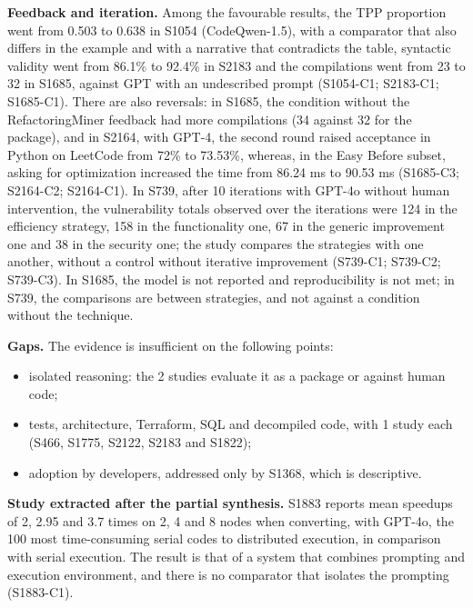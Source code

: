 \textbf{Feedback and iteration.}
Among the favourable results, the TPP proportion went from 0.503 to 0.638 in S1054 (CodeQwen-1.5), with a comparator that also differs in the example and with a narrative that contradicts the table, syntactic validity went from 86.1\% to 92.4\% in S2183 and the compilations went from 23 to 32 in S1685, against GPT with an undescribed prompt (S1054-C1; S2183-C1; S1685-C1).
There are also reversals: in S1685, the condition without the RefactoringMiner feedback had more compilations (34 against 32 for the package), and in S2164, with GPT-4, the second round raised acceptance in Python on LeetCode from 72\% to 73.53\%, whereas, in the Easy Before subset, asking for optimization increased the time from 86.24 ms to 90.53 ms (S1685-C3; S2164-C2; S2164-C1).
In S739, after 10 iterations with GPT-4o without human intervention, the vulnerability totals observed over the iterations were 124 in the efficiency strategy, 158 in the functionality one, 67 in the generic improvement one and 38 in the security one; the study compares the strategies with one another, without a control without iterative improvement (S739-C1; S739-C2; S739-C3).
In S1685, the model is not reported and reproducibility is not met; in S739, the comparisons are between strategies, and not against a condition without the technique.

\textbf{Gaps.} The evidence is insufficient on the following points:
\begin{itemize}
  \item isolated reasoning: the 2 studies evaluate it as a package or against human code;
  \item tests, architecture, Terraform, SQL and decompiled code, with 1 study each (S466, S1775, S2122, S2183 and S1822);
  \item adoption by developers, addressed only by S1368, which is descriptive.
\end{itemize}

\textbf{Study extracted after the partial synthesis.}
S1883 reports mean speedups of 2, 2.95 and 3.7 times on 2, 4 and 8 nodes when converting, with GPT-4o, the 100
most time-consuming serial codes to distributed execution, in comparison with serial execution. The result is that of a
system that combines prompting and execution environment, and there is no comparator that isolates the prompting (S1883-C1).
